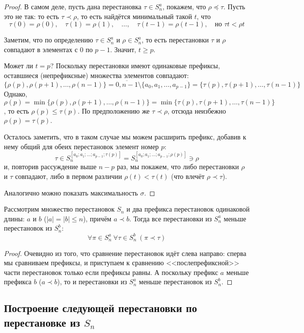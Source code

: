 \documentclass[12pt,a4paper,oneside]{article}
\begin{document}
\begin{proof}
В самом деле, пусть дана перестановка $\tau \in S^a_n$, покажем, что $\rho\preceq\tau$.
Пусть это не так: то есть $\tau\prec\rho$, то есть найдётся минимальный такой $t$, что 
$$\tau(0) = \rho(0),\quad \tau(1) = \rho(1) ,\quad\dots,\quad \tau(t-1) = \rho(t-1), \quad\mbox{но } \tau{t}<\rho{t}$$

Заметим, что по определению $\tau \in S^a_n$ и $\rho\in S^a_n$, то есть перестановки $\tau$ и $\rho$ совпадают в 
элементах с 0 по $p-1$. Значит, $t\ge p$. 

Может ли $t=p$? Поскольку перестановки имеют одинаковые префиксы, оставшиеся (непрефиксные) множества элементов
совпадают: $$\{\rho(p),\rho(p+1),\dots,\rho(n-1)\} = \overline{0,n-1}\setminus\{a_0,a_1,\dots,a_{p-1}\} =
\{\tau(p),\tau(p+1),\dots,\tau(n-1)\}$$
Однако, $\rho(p) = \min\{\rho(p),\rho(p+1),\dots,\rho(n-1)\}=\min\{\tau(p),\tau(p+1),\dots,\tau(n-1)\}$, то есть $\rho(p)\le\tau(p)$.
По предположению же $\tau\prec\rho$, отсюда неизбежно $\rho(p)=\tau(p)$.

Осталось заметить, что в таком случае мы можем расширить префикс, добавив к нему общий 
для обеих перестановок элемент номер $p$:
$$\tau \in S^{[a_0;a_1;\dots;a_{p-1};\tau(p)]}_n = S^{[a_0;a_1;\dots;a_{p-1};\rho(p)]}_n \ni \rho$$
и, повторив рассуждение выше $n-p$ раз, мы покажем, что либо перестановки $\rho$ и $\tau$ совпадают,
либо в первом различии $\rho(t) < \tau(t)$ (что влечёт $\rho\prec\tau$).

Аналогично можно показать максимальность $\sigma$.
\end{proof}

\begin{lemma}\label{prefixorder}
Рассмотрим множество перестановок $S_n$ и два префикса перестановок одинаковой
длины: $a$ и $b$ ($|a| = |b| \le n$), причём $a \prec b$. Тогда все перестановки 
из $S^a_n$ меньше перестановок из $S^b_n$: $$\forall \pi\in S^a_n\ \forall \tau\in S^b_n\ (\pi \prec \tau)$$
\end{lemma}

\begin{proof}
Очевидно из того, что сравнение перестановок идёт слева направо: сперва мы сравниваем
префиксы, и приступаем к сравнению <<послепрефиксной>> части перестановок только
если префиксы равны. А поскольку префикс $a$ меньше префикса $b$ ($a \prec b$), то и 
перестановки из $S^a_n$ меньше перестановок из $S^b_n$.
\end{proof}

\subsection{Построение следующей перестановки по перестановке из $S_n$}
\end{document}

